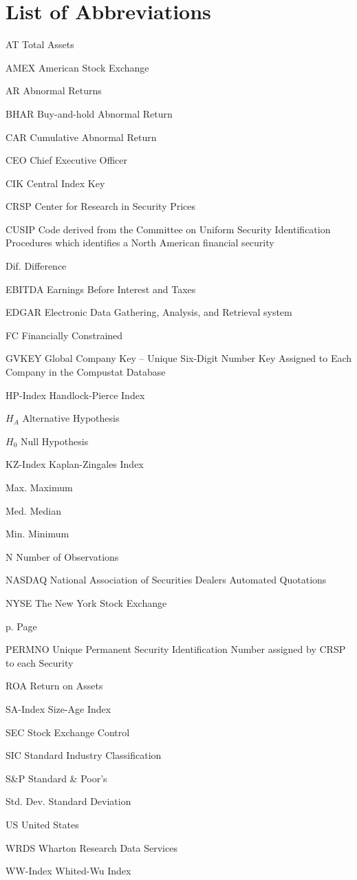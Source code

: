 \documentclass[12pt]{article}
\newcommand{\abbrlabel}[1]{\makebox[7cm][l]{#1\ \dotfill}}
\newenvironment{abbreviations}{\begin{list}{}{\renewcommand{\makelabel}{\abbrlabel}\setlength{\labelwidth}{7cm}\setlength{\leftmargin}{\labelwidth+\labelsep}%
\setlength{\itemsep}{0pt}}}{\end{list}}
\begin{document}
\section*{List of Abbreviations}
\begin{abbreviations}
	\item[AT] Total Assets
	\item[AMEX] American Stock Exchange
	\item[AR] Abnormal Returns
	\item[BHAR] Buy-and-hold Abnormal Return
	\item[CAR] Cumulative Abnormal Return
	\item[CEO] Chief Executive Officer
	\item[CIK] Central Index Key
	\item[CRSP] Center for Research in Security Prices
	\item[CUSIP] Code derived from the Committee on Uniform Security Identification Procedures which identifies a North American financial security
	\item[Dif.] Difference
	\item[EBITDA] Earnings Before Interest and Taxes
	\item[EDGAR] Electronic Data Gathering, Analysis, and Retrieval system
	\item[FC] Financially Constrained
	\item[GVKEY] Global Company Key -- Unique Six-Digit Number Key Assigned to Each Company in the Compustat Database
	\item[HP-Index] Handlock-Pierce Index
	\item[$H_{A}$] Alternative Hypothesis 
	\item[$H_{0}$] Null Hypothesis 
	\item[KZ-Index] Kaplan-Zingales Index
	\item[Max.] Maximum
	\item[Med.] Median
	\item[Min.] Minimum
	\item[N] Number of Observations
	\item[NASDAQ] National Association of Securities Dealers Automated Quotations
	\item[NYSE] The New York Stock Exchange
	\item[p.] Page
	\item[PERMNO] Unique Permanent Security Identification Number assigned by CRSP to each Security
	\item[ROA] Return on Assets
	\item[SA-Index] Size-Age Index
	\item[SEC] Stock Exchange Control 
	\item[SIC] Standard Industry Classification
	\item[S\&P] Standard \& Poor's
	\item[Std. Dev.] Standard Deviation
	\item[US] United States
	\item[WRDS] Wharton Research Data Services
	\item[WW-Index] Whited-Wu Index
\end{abbreviations}
\end{document}
